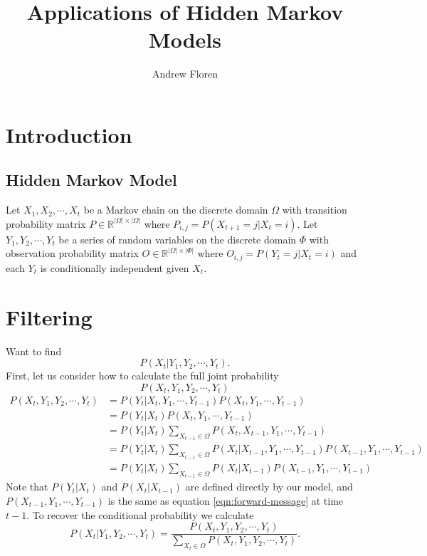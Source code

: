 \documentclass{article}
\title{Applications of Hidden Markov Models}
\author{Andrew Floren}
\begin{document}
\maketitle

\section*{Introduction}

\subsection*{Hidden Markov Model}
Let $X_1, X_2, \cdots, X_t$ be a Markov chain on the discrete domain $\Omega$ with transition probability matrix $P \in \mathbb{R}^{|\Omega| \times |\Omega|} $ where $P_{i,j} = P(X_{t+1} = j | X_{t} = i)$. Let $Y_1, Y_2, \cdots, Y_t$ be a series of random variables on the discrete domain $\Phi$ with observation probability matrix $O \in \mathbb{R}^{|\Omega| \times |\Phi|}$ where $O_{i,j} = P(Y_t = j | X_t = i)$ and each $Y_t$ is conditionally independent given $X_t$.

\section{Filtering}
Want to find
\begin{equation}
\label{eqn:filtering}
P(X_t | Y_1, Y_2, \cdots, Y_t).
\end{equation}
First, let us consider how to calculate the full joint probability 
\begin{equation}
\label{eqn:forward-message}
P(X_{t}, Y_{1}, Y_{2}, \cdots, Y_t)
\end{equation}
\begin{align}
P(X_{t}, Y_{1}, Y_{2}, \cdots, Y_t) &= P(Y_{t} | X_{t}, Y_{1}, \cdots, Y_{t-1}) P(X_{t}, Y_{1}, \cdots, Y_{t-1}) \\ 
&= P(Y_{t} | X_{t}) P(X_{t}, Y_{1}, \cdots, Y_{t-1}) \\
&= P(Y_{t} | X_{t}) \sum_{X_{t-1} \in \Omega}{P(X_{t}, X_{t-1}, Y_{1}, \cdots, Y_{t-1})} \\
&= P(Y_{t} | X_{t}) \sum_{X_{t-1} \in \Omega}{P(X_{t} | X_{t-1}, Y_{1}, \cdots, Y_{t-1}) P(X_{t-1}, Y_{1}, \cdots, Y_{t-1})} \\
&= P(Y_{t} | X_{t}) \sum_{X_{t-1} \in \Omega}{P(X_{t} | X_{t-1})P(X_{t-1}, Y_{1}, \cdots, Y_{t-1})}
\end{align}
Note that $P(Y_{t} | X_{t})$ and $P(X_{t} | X_{t-1})$ are defined directly by our model, and $P(X_{t-1}, Y_{1}, \cdots, Y_{t-1})$ is the same as equation \ref{eqn:forward-message} at time $t-1$.
To recover the conditional probability we calculate
\begin{equation}
P(X_t | Y_1, Y_{2}, \cdots, Y_t) = \frac{P(X_t, Y_1, Y_{2}, \cdots, Y_t)}{\sum_{X_t \in \Omega}{P(X_t, Y_1, Y_{2}, \cdots, Y_t)}}.
\end{equation}
\end{document}

